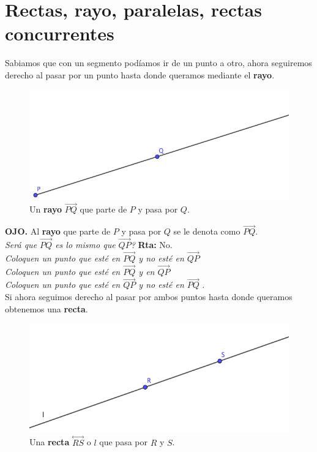 \section{Rectas, rayo, paralelas, rectas concurrentes}\label{subseccion_rayo_recta_paralelas_etc}

Sabiamos que con un segmento podíamos ir de un punto a otro, ahora seguiremos derecho al pasar por un punto hasta donde queramos mediante el \textbf{rayo}.

\begin{figure}[H]
	\centering
	\includegraphics[width=0.8\linewidth]{Geometria/imgs/rayo}
	\caption{Un \textbf{rayo} $\overset\rightarrow{PQ}$ que parte de $P$ y pasa por $Q$.}
	\label{rayo}
\end{figure}

\textbf{OJO. } Al \textbf{rayo} que parte de $P$ y pasa por $Q$ se le denota como $\overrightarrow{PQ}$.\\

\textit{Será que $\overrightarrow{PQ}$ es lo mismo que $\overrightarrow{QP}$?} \textbf{Rta:} No.\\
\textit{Coloquen un punto que esté en  $\overrightarrow{PQ}$ y no esté en  $\overrightarrow{QP}$ }\\
\textit{Coloquen un punto que esté en  $\overrightarrow{PQ}$ y en  $\overrightarrow{QP}$ }\\
\textit{Coloquen un punto que esté en  $\overrightarrow{QP}$ y no esté en  $\overrightarrow{PQ}$ }.\\

Si ahora seguimos derecho al pasar por ambos puntos hasta donde queramos obtenemos una \textbf{recta}.
\begin{figure}[H]
	\centering
	\includegraphics[width=0.8\linewidth]{Geometria/imgs/recta}
	\caption{Una \textbf{recta} $\overset\leftrightarrow{RS}$ o $l$ que pasa por $R$ y $S$.}
	\label{recta}
\end{figure}

